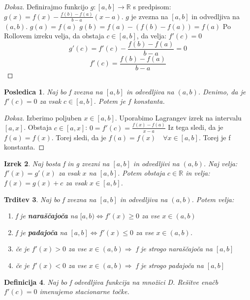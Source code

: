 \documentclass[11pt]{article}
\newtheorem{Izrek}{{\sc Izrek}}[section]
\newtheorem{Trditev}[Izrek]{{\sc Trditev}}
\newtheorem{Posledica}[Izrek]{{\sc Posledica}}
\newtheorem{Definicija}[Izrek]{{\sc Definicija}}
\newenvironment{dokaz}[1][{\sc Dokaz}]{\begin{proof}[#1]\renewcommand*{\qedsymbol}{\(\blacksquare\)}}{\end{proof}}
\begin{document}
\begin{dokaz}
	Definirajmo funkcijo $g: [a,b]\to \mathbb{R}$ s predpisom:\newline $g(x) =f(x) - \frac{f(b) -f(a)}{b - a}(x-a)$. $g$ je zvezna na $[a,b]$ in odvedljiva na $(a,b)$.
	\newline
	$g(a) = f(a)$
	\newline
	$g(b) =f(a) - (f(b) - f(a)) = f(a)$
	\newline
	Po Rollovem izreku velja, da obstaja $c\in [a,b]$, da velja: $f'(c) = 0$
	$$g'(c) = f'(c) - \frac{f(b) - f(a)}{b - a} = 0$$
	$$f'(c) = \frac{f(b) - f(a)}{b - a}$$
\end{dokaz}
\begin{Posledica}
	Naj bo f zvezna na $[a,b]$ in odvedljiva na $(a,b)$. Denimo, da je $f'(c) = 0$ za vsak $c\in [a,b]$. Potem je $f$ konstanta.
\end{Posledica}
\begin{dokaz}
	Izberimo poljuben $x \in [a,b]$. Uporabimo Lagrangev izrek na intervalu $[a,x]$. Obstaja $c \in [a,x]$:
	\newline
	$ 0 = f'(c) = \frac{f(x) - f(a)}{x - a}$
	\newline
	Iz tega sledi, da je $f(a) = f(x)$.
	Torej sledi, da je $f(a) = f(x) \quad \forall x\in [a,b]$. Torej je f konstanta.
\end{dokaz}
\begin{Izrek}
	Naj bosta f in g zvezni na $[a,b]$ in odvedljivi na $(a,b)$. Naj velja: $f'(x) = g'(x)$ za vsak $x$ na $[a,b]$. Potem obstaja $c \in \mathbb{R}$ in velja: $f(x) = g(x) + c$ za vsak $x \in [a,b]$.
\end{Izrek}
\pagebreak
\begin{Trditev}
	Naj bo f zvezna na $[a,b]$ in odvedljiva na $(a,b)$. Potem velja:
	\begin{enumerate}
		\item
		f je \textbf{naraščajoča} na $[a,b) \iff f'(x) \ge 0$ za vse $x \in (a,b)$
		\item
		f je \textbf{padajoča}  na $[a,b] \iff f'(x) \le 0$ za vse $x\in (a,b)$.
		\item
		če je $f'(x) > 0$ za vse $x \in (a,b) \Rightarrow$ f je strogo naraščajoča na $[a,b]$
		\item
		če je $f'(x) < 0$ za vse $x \in (a,b) \Rightarrow$ f je strogo padajoča na $[a,b]$
	\end{enumerate}
\end{Trditev}
\begin{Definicija}
	Naj bo f odvedljiva funkcija na množici D. Rešitve enačb $f'(c) = 0$ imenujemo stacionarne točke.
\end{Definicija}
\end{document}
